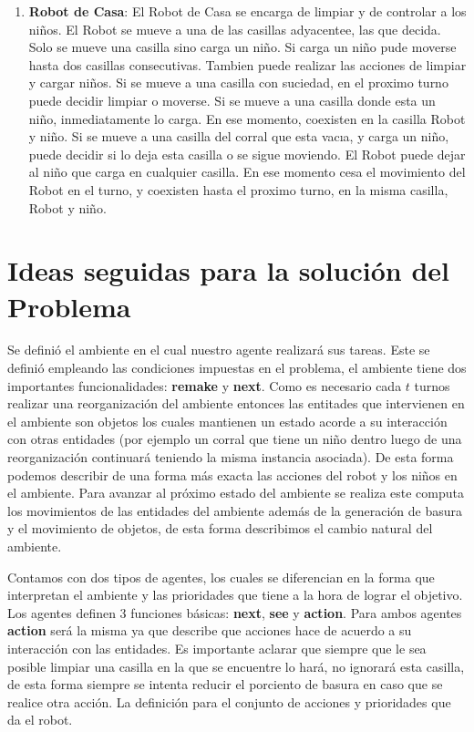 \documentclass[a4paper,10pt,twocolumn]{article}
\begin{document}
\begin{enumerate}
	\item[] \textbf{Robot de Casa}: El Robot de Casa se encarga de limpiar y de controlar a los ni\~nos. El Robot se mueve a una de las casillas adyacentee, las que decida. Solo se mueve una casilla sino carga un ni\~no. Si carga un ni\~no pude moverse hasta dos casillas consecutivas. Tambien puede realizar las acciones de limpiar y cargar ni\~nos. Si se mueve a una casilla con suciedad, en el proximo turno puede decidir limpiar o moverse. Si se mueve a una casilla donde esta un ni\~no, inmediatamente lo carga. En ese momento, coexisten en la casilla Robot y ni\~no. Si se mueve a una casilla del corral que esta vacıa, y carga un ni\~no, puede decidir si lo deja esta casilla o se sigue moviendo. El Robot puede dejar al ni\~no que carga en cualquier casilla. En ese momento cesa el movimiento del Robot en el turno, y coexisten hasta el proximo turno, en la misma casilla, Robot y ni\~no.

\end{enumerate}


\section*{Ideas seguidas para la soluci\'on del Problema}

Se defini\'o el ambiente en el cual nuestro agente realizar\'a sus tareas. Este se defini\'o empleando las condiciones impuestas en el problema, el ambiente tiene dos importantes funcionalidades: \textbf{remake} y \textbf{next}. Como es necesario cada $t$ turnos realizar una reorganizaci\'on del ambiente entonces las entitades que intervienen en el ambiente son objetos los cuales mantienen un estado acorde a su interacci\'on con otras entidades (por ejemplo un corral que tiene un ni\~no dentro luego de una reorganizaci\'on continuar\'a teniendo la misma instancia asociada). De esta forma podemos describir de una forma m\'as exacta las acciones del robot y los ni\~nos en el ambiente. Para avanzar al pr\'oximo estado del ambiente se realiza  este computa los movimientos de las entidades del ambiente adem\'as de la generaci\'on de basura y el movimiento de objetos, de esta forma describimos el cambio natural del ambiente.

Contamos con dos tipos de agentes, los cuales se diferencian en la forma que interpretan el ambiente y las prioridades que tiene a la hora de lograr el objetivo. Los agentes definen 3 funciones b\'asicas: \textbf{next}, \textbf{see} y \textbf{action}. Para ambos agentes \textbf{action} ser\'a la misma ya que describe que acciones hace de acuerdo a su interacci\'on con las entidades. Es importante aclarar que siempre que le sea posible limpiar una casilla en la que se encuentre lo har\'a, no ignorar\'a esta casilla, de esta forma siempre se intenta reducir el porciento de basura en caso que se realice otra acci\'on. La definici\'on para el conjunto de acciones y prioridades que da el robot.
\end{document}
